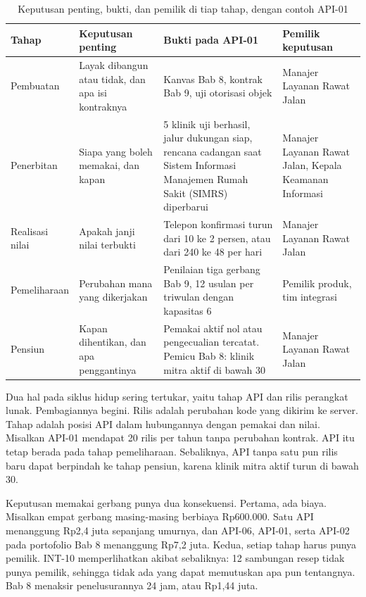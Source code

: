 \begin{table}[!htb]
  \centering
  \caption{Keputusan penting, bukti, dan pemilik di tiap tahap, dengan contoh API-01}
  \label{tab:ch10-gerbang}
  \footnotesize
  \begin{tabularx}{\textwidth}{H{1.95cm}GGH{2.2cm}}
    \hline
    \textbf{Tahap} & \textbf{Keputusan penting} & \textbf{Bukti pada API-01} & \textbf{Pemilik keputusan} \\ \hline
    Pembuatan & Layak dibangun atau tidak, dan apa isi kontraknya & Kanvas Bab 8, kontrak Bab 9, uji otorisasi objek & Manajer Layanan Rawat Jalan \\ \hline
    Penerbitan & Siapa yang boleh memakai, dan kapan & 5 klinik uji berhasil, jalur dukungan siap, rencana cadangan saat Sistem Informasi Manajemen Rumah Sakit (SIMRS) diperbarui & Manajer Layanan Rawat Jalan, Kepala Keamanan Informasi \\ \hline
    Realisasi nilai & Apakah janji nilai terbukti & Telepon konfirmasi turun dari 10 ke 2 persen, atau dari 240 ke 48 per hari & Manajer Layanan Rawat Jalan \\ \hline
    Pemeliharaan & Perubahan mana yang dikerjakan & Penilaian tiga gerbang Bab 9, 12 usulan per triwulan dengan kapasitas 6 & Pemilik produk, tim integrasi \\ \hline
    Pensiun & Kapan dihentikan, dan apa penggantinya & Pemakai aktif nol atau pengecualian tercatat. Pemicu Bab 8: klinik mitra aktif di bawah 30 & Manajer Layanan Rawat Jalan \\ \hline
  \end{tabularx}
\end{table}

Dua hal pada siklus hidup sering tertukar, yaitu tahap API dan rilis perangkat lunak. Pembagiannya begini. Rilis adalah
perubahan kode yang dikirim ke server. Tahap adalah posisi API dalam hubungannya dengan pemakai dan nilai. Misalkan
API-01 mendapat 20 rilis per tahun tanpa perubahan kontrak. API itu tetap berada pada tahap pemeliharaan. Sebaliknya,
API tanpa satu pun rilis baru dapat berpindah ke tahap pensiun, karena klinik mitra aktif turun di bawah 30.

Keputusan memakai gerbang punya dua konsekuensi. Pertama, ada biaya. Misalkan empat gerbang masing-masing berbiaya
Rp600.000. Satu API menanggung Rp2,4 juta sepanjang umurnya, dan API-06, API-01, serta API-02 pada portofolio Bab 8
menanggung Rp7,2 juta. Kedua, setiap tahap harus punya pemilik. INT-10 memperlihatkan akibat sebaliknya: 12 sambungan
resep tidak punya pemilik, sehingga tidak ada yang dapat memutuskan apa pun tentangnya. Bab 8 menaksir penelusurannya 24
jam, atau Rp1,44 juta.

